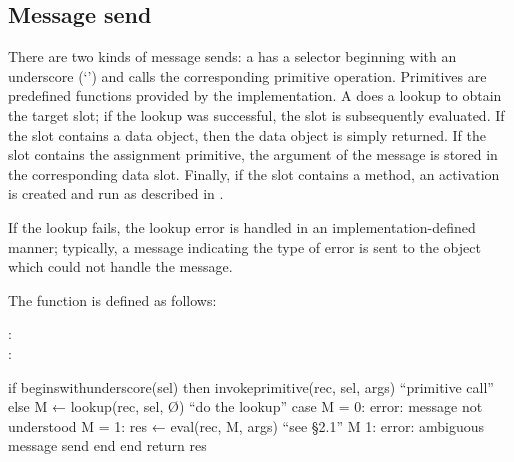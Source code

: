 \documentclass[letterpaper,10pt,english]{sphinxmanual}
\begin{document}
\subsection{Message send}
\label{\detokenize{langref:pp-mesage-send}}\label{\detokenize{langref:message-send}}
There are two kinds of message sends: a  has a selector beginning with an underscore (‘\sphinxcode{\_}’) and calls the corresponding primitive operation. Primitives are predefined functions provided by the implementation. A  does a lookup to obtain the target slot; if the lookup was successful, the slot is subsequently evaluated. If the slot contains a data object, then the data object is simply returned. If the slot contains the assignment primitive, the argument of the message is stored in the corresponding data slot. Finally, if the slot contains a method, an activation is created and run as described in {\hyperref[\detokenize{langref:pp-methods}]{}}.

If the lookup fails, the lookup error is handled in an implementation-defined manner; typically, a message indicating the type of error is sent to the object which could not handle the message.

The function  is defined as follows:
\begin{description}
\item[{:}] \leavevmode
{}

\item[{:}] \leavevmode
{}

\end{description}


\begin{sphinxVerbatim}[commandchars=\\\{\}]
if begins\PYGZus{}with\PYGZus{}underscore(sel)
then invoke\PYGZus{}primitive(rec, sel, args)               “primitive call”
else M ← lookup(rec, sel, Ø)                        “do the lookup”
    case
        \textbar{} M \textbar{} = 0: error: message not understood
        \textbar{} M \textbar{} = 1: res ← eval(rec, M, args)         “see \S{}2.1”
        \textbar{} M \textbar{} \PYGZgt{} 1: error: ambiguous message send
    end
end
return res
\end{sphinxVerbatim}
\end{document}
